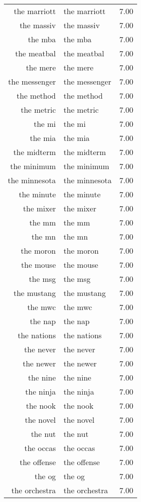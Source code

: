 \begin{table}[ht]
\begin{tabular}{rlr}
  the marriott & the marriott & 7.00 \\ 
  the massiv & the massiv & 7.00 \\ 
  the mba & the mba & 7.00 \\ 
  the meatbal & the meatbal & 7.00 \\ 
  the mere & the mere & 7.00 \\ 
  the messenger & the messenger & 7.00 \\ 
  the method & the method & 7.00 \\ 
  the metric & the metric & 7.00 \\ 
  the mi & the mi & 7.00 \\ 
  the mia & the mia & 7.00 \\ 
  the midterm & the midterm & 7.00 \\ 
  the minimum & the minimum & 7.00 \\ 
  the minnesota & the minnesota & 7.00 \\ 
  the minute & the minute & 7.00 \\ 
  the mixer & the mixer & 7.00 \\ 
  the mm & the mm & 7.00 \\ 
  the mn & the mn & 7.00 \\ 
  the moron & the moron & 7.00 \\ 
  the mouse & the mouse & 7.00 \\ 
  the msg & the msg & 7.00 \\ 
  the mustang & the mustang & 7.00 \\ 
  the mwc & the mwc & 7.00 \\ 
  the nap & the nap & 7.00 \\ 
  the nations & the nations & 7.00 \\ 
  the never & the never & 7.00 \\ 
  the newer & the newer & 7.00 \\ 
  the nine & the nine & 7.00 \\ 
  the ninja & the ninja & 7.00 \\ 
  the nook & the nook & 7.00 \\ 
  the novel & the novel & 7.00 \\ 
  the nut & the nut & 7.00 \\ 
  the occas & the occas & 7.00 \\ 
  the offense & the offense & 7.00 \\ 
  the og & the og & 7.00 \\ 
  the orchestra & the orchestra & 7.00 \\ 

\end{tabular}
\end{table}

